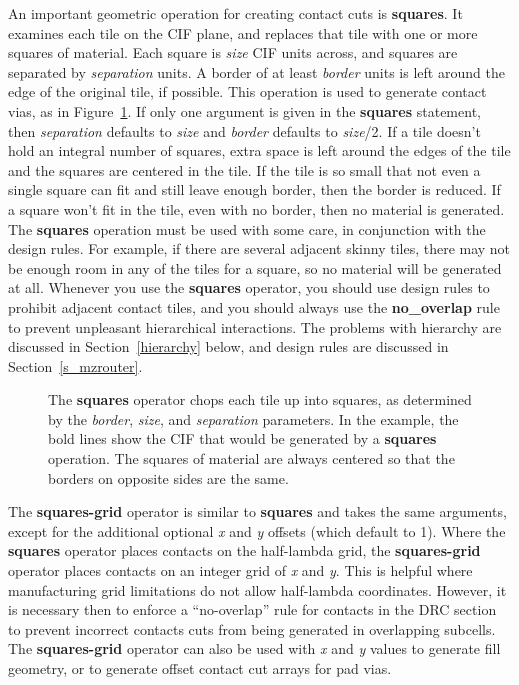 \documentclass[letterpaper,twoside,12pt]{article}
\begin{document}
An important geometric operation for creating contact cuts is
{\bfseries squares}.  It examines
each tile on the CIF plane, and replaces that tile with one or
more squares of material.  Each square is {\itshape size} CIF units
across, and squares are separated by {\itshape separation} units.  A border
of at least {\itshape border} units is left around the edge of the original
tile, if possible.  This operation is used to generate contact vias, as in
Figure~\ref{squares}.  If only one argument is given in the {\bfseries squares}
statement, then {\itshape separation} defaults to {\itshape size} and
{\itshape border} defaults to {\itshape size}/2.  If a tile doesn't hold an
integral number of squares, extra space is left around the edges of
the tile and the squares are centered in the tile.  If the tile is
so small that not even a single square can fit and still leave enough
border, then the border is reduced.  If a square won't fit in the
tile, even with no border, then no material is generated.
The {\bfseries squares} operation
must be used with some care, in conjunction with the design rules.
For example, if there are several adjacent skinny tiles, there
may not be enough room in any of the tiles for a square, so no
material will be generated at all.  Whenever you use the {\bfseries squares}
operator, you should use design rules to prohibit adjacent contact
tiles, and you should always use the {\bfseries no{\_}overlap} rule to prevent
unpleasant hierarchical interactions.  The problems with hierarchy
are discussed in Section~\ref{hierarchy} below, and design rules are discussed
in Section~\ref{s_mzrouter}.

\begin{figure}[ht]
   \begin{center}
      \caption{The {\bfseries squares} operator chops each tile up
	into squares, as determined by the {\itshape border}, {\itshape size},
	and {\itshape separation} parameters.  In the example, the bold
	lines show the CIF that would be generated by a {\bfseries squares}
	operation.  The squares of material are always centered so that
	the borders on opposite sides are the same.}
      \label{squares}
   \end{center}
\end{figure}

The {\bfseries squares-grid} operator is similar to {\bfseries squares} and
takes the same arguments, except for the additional optional {\itshape x} and
{\itshape y} offsets (which default to 1).  Where the {\bfseries squares}
operator places contacts on the half-lambda grid, the {\bfseries squares-grid}
operator places contacts on an integer grid of {\itshape x} and {\itshape y}.
This is helpful where manufacturing grid limitations do not allow half-lambda
coordinates.  However, it is necessary then to enforce a ``no-overlap'' rule
for contacts in the DRC section to prevent incorrect contacts cuts from
being generated in overlapping subcells.  The {\bfseries squares-grid}
operator can also be used with {\itshape x} and {\itshape y} values to
generate fill geometry, or to generate offset contact cut arrays for pad
vias.
\end{document}

